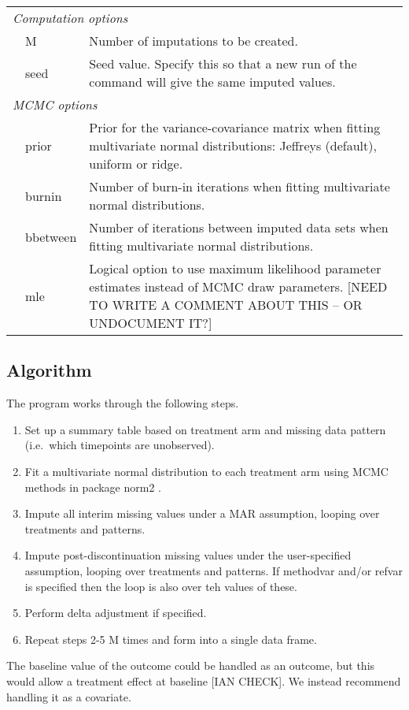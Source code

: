 \begin{tabular}{llp{.8\linewidth}}
\multicolumn{3}{l}{\em Computation options}\\
& M 	&	 Number of imputations to be created. \\
& seed 	&	 Seed value. Specify this so that a new run of the command will give the same imputed values.	\\

\multicolumn{3}{l}{\em MCMC options} \\
& prior 	&	 Prior for the variance-covariance matrix when fitting multivariate normal distributions: Jeffreys (default), uniform or ridge.	\\
& burnin 	&	 Number of burn-in iterations when fitting multivariate normal distributions.	\\
& bbetween 	&	 Number of iterations between imputed data sets when fitting multivariate normal distributions.	\\
& mle 	&	 Logical option to use maximum likelihood parameter estimates instead of MCMC draw parameters. [NEED TO WRITE A COMMENT ABOUT THIS -- OR UNDOCUMENT IT?]	\\ \hline
\end{tabular}

\subsection{Algorithm}

The program works through the following steps.
\begin{enumerate}
\item Set up a summary table based on treatment arm and missing data pattern (i.e.\ which timepoints are unobserved).
\item Fit a multivariate normal distribution to each treatment arm using MCMC methods in package norm2 \citep{norm2}.
\item Impute all interim missing values under a MAR assumption, looping over treatments and patterns.
\item Impute post-discontinuation missing values under the user-specified assumption, looping over treatments and patterns. If methodvar and/or refvar is specified then the loop is also over teh values of these.
\item Perform delta adjustment if specified.
\item Repeat steps 2-5 M times and form into a single data frame.
\end{enumerate}
The baseline value of the outcome could be handled as an outcome, but this would allow a treatment effect at baseline [IAN CHECK]. We instead recommend handling it as a covariate. 

